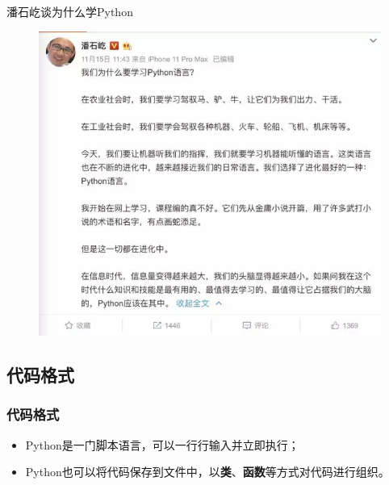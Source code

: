 \documentclass[11pt]{beamer}
\begin{document}
\begin{frame}{潘石屹谈为什么学Python}
	\begin{figure}
		\centering
		\includegraphics[width=0.6\linewidth]{figures/pythonPanshiyi02}
		\label{fig:pythonpanshiyi02}
	\end{figure}
\end{frame}

\subsection{代码格式}

\begin{frame}[fragile]
	\frametitle{代码格式}

		\begin{minipage}[t]{0.5\linewidth}
				\begin{itemize}
					\item Python是一门脚本语言，可以一行行输入并立即执行；
					\item Python也可以将代码保存到文件中，以\textbf{类}、\textbf{函数}等方式对代码进行组织。
				\end{itemize}
	\end{minipage}%
	\begin{minipage}[t]{0.05\linewidth}
		\quad
\end{minipage}%
	\begin{minipage}[t]{0.4\linewidth}
		\begin{figure}
					
		\end{figure}
	\end{minipage}%
\end{frame}
\end{document}
